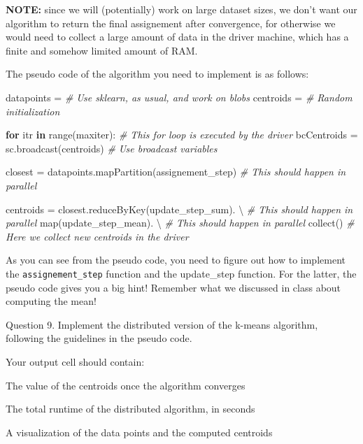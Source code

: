 \documentclass[11pt]{article}
\newenvironment{Shaded}{}{}
\newcommand{\KeywordTok}[1]{\textcolor[rgb]{0.00,0.44,0.13}{\textbf{{#1}}}}
\newcommand{\CommentTok}[1]{\textcolor[rgb]{0.38,0.63,0.69}{\textit{{#1}}}}
\newcommand{\NormalTok}[1]{{#1}}
\newcommand{\ControlFlowTok}[1]{\textcolor[rgb]{0.00,0.44,0.13}{\textbf{{#1}}}}
\newcommand{\OperatorTok}[1]{\textcolor[rgb]{0.40,0.40,0.40}{{#1}}}
\newcommand{\BuiltInTok}[1]{{#1}}
\begin{document}
\textbf{NOTE:} since we will (potentially) work on large dataset sizes,
we don't want our algorithm to return the final assignement after
convergence, for otherwise we would need to collect a large amount of
data in the driver machine, which has a finite and somehow limited
amount of RAM.

The pseudo code of the algorithm you need to implement is as follows:

\begin{Shaded}
\begin{Highlighting}[]
\NormalTok{datapoints }\OperatorTok{=} \CommentTok{# Use sklearn, as usual, and work on blobs}
\NormalTok{centroids }\OperatorTok{=} \CommentTok{# Random initialization}

\ControlFlowTok{for}\NormalTok{ itr }\KeywordTok{in} \BuiltInTok{range}\NormalTok{(maxiter): }\CommentTok{# This for loop is executed by the driver}
\NormalTok{    bcCentroids }\OperatorTok{=}\NormalTok{ sc.broadcast(centroids) }\CommentTok{# Use broadcast variables}
    
\NormalTok{    closest }\OperatorTok{=}\NormalTok{ datapoints.mapPartition(assignement_step) }\CommentTok{# This should happen in parallel}
    
\NormalTok{    centroids }\OperatorTok{=}\NormalTok{ closest.reduceByKey(update_step_sum). }\OperatorTok{\textbackslash{}} \CommentTok{# This should happen in parallel}
        \BuiltInTok{map}\NormalTok{(update_step_mean). }\OperatorTok{\textbackslash{}} \CommentTok{# This should happen in parallel}
\NormalTok{        collect() }\CommentTok{# Here we collect new centroids in the driver}
\end{Highlighting}
\end{Shaded}

As you can see from the pseudo code, you need to figure out how to
implement the \texttt{assignement\_step} function and the update\_step
function. For the latter, the pseudo code gives you a big hint! Remember
what we discussed in class about computing the mean!

    Question 9. Implement the distributed version of the k-means algorithm,
following the guidelines in the pseudo code.

Your output cell should contain:

The value of the centroids once the algorithm converges

The total runtime of the distributed algorithm, in seconds

A visualization of the data points and the computed centroids
\end{document}
